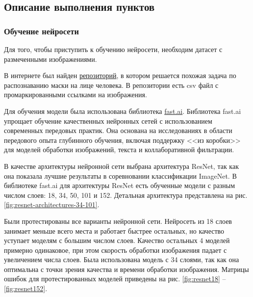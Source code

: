 \documentclass[a4paper,14pt]{article}
\begin{document}



\subsection{Описание выполнения пунктов}

\subsubsection{Обучение нейросети}

Для того, чтобы приступить к обучению нейросети, необходим датасет с размеченными изображениями.

В интернете был найден \href{https://github.com/UniversalDataTool/coronavirus-mask-image-dataset}{репозиторий}, в котором решается похожая задача по распознаванию маски на лице человека.
В репозитории есть csv файл с промаркированными ссылками на изображения.

Для обучения модели была использована библиотека \href{https://docs.fast.ai/}{fast.ai}.
Библиотека fast.ai упрощает обучение качественных нейронных сетей с использованием современных передовых практик.
Она основана на исследованиях в области передового опыта глубинного обучения, включая поддержку <<из коробки>> для моделей обработки изображений, текста и коллаборативной фильтрации.

В качестве архитектуры нейронной сети выбрана архитектура ResNet, так как она показала лучшие результаты в соревновании классификации ImageNet.
В библиотеке fast.ai для архитектуры ResNet есть обученные модели с разным числом слоев: 18, 34, 50, 101 и 152.
Детальная архитектура представлена на рис. \ref{fig:resnet-architectures-34-101}.

Были протестированы все варианты нейронной сети.
Нейросеть из 18 слоев занимает меньше всего места и работает быстрее остальных, но качество уступает моделям с большим числом слоев.
Качество остальных 4 моделей примерно одинаковое, при этом скорость обработки изображения падает с увеличением числа слоев.
Была использована модель с 34 слоями, так как она оптимальна с точки зрения качества и времени обработки изображения.
Матрицы ошибок для протестированных моделей приведены на рис. \ref{fig:resnet18} -- \ref{fig:resnet152}.
\end{document}
